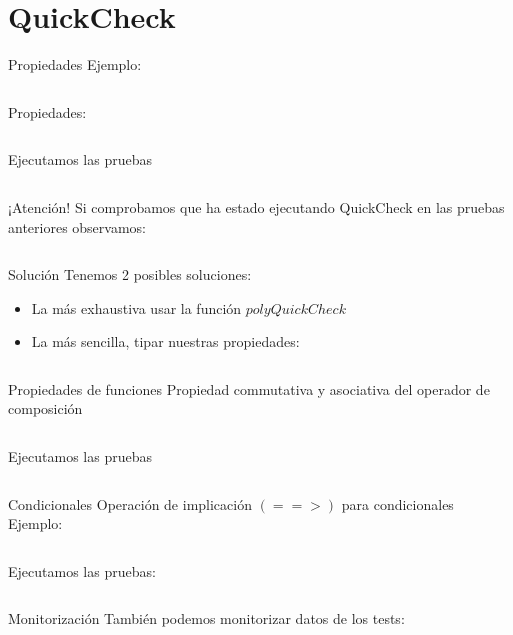 \documentclass[10pt]{beamer}
\begin{document}
\section{QuickCheck}

\begin{frame}{Propiedades}
  Ejemplo:
  \inputminted{text}{data/reverse.hs}
  Propiedades:
  \inputminted{haskell}{data/reverse_prop.hs}
\end{frame}

\begin{frame}{Ejecutamos las pruebas}
  \inputminted{text}{data/pruebas_rev.txt}
\end{frame}

\begin{frame}{¡Atención!}
  Si comprobamos que ha estado ejecutando QuickCheck en las pruebas
  anteriores observamos:
  \inputminted{text}{data/reverse_prop_pruebas_verb.txt}
\end{frame}

\begin{frame}{Solución}
  Tenemos 2 posibles soluciones:
  \begin{itemize}
  \item La más exhaustiva usar la función $polyQuickCheck$
  \item La más sencilla, tipar nuestras propiedades:
    \inputminted{text}{data/reverse_prop_pruebas_verb1.txt}
  \end{itemize}
\end{frame}

\begin{frame}{Propiedades de funciones}
  Propiedad commutativa y asociativa del operador de composición
  \inputminted{haskell}{data/func_prop.hs}
\end{frame}

\begin{frame}{Ejecutamos las pruebas}
  \inputminted{text}{data/pruebas_func.txt}
\end{frame}

\begin{frame}{Condicionales}
  Operación de implicación $(==>)$ para condicionales
  Ejemplo:
  \inputminted{haskell}{data/max_prop.hs}
  Ejecutamos las pruebas:
  \inputminted{text}{data/pruebas_max_prop.txt}
\end{frame}

\begin{frame}{Monitorización}
  También podemos monitorizar datos de los tests:
  \inputminted{haskell}{data/monitor_test.hs}
\end{frame}
\end{document}
